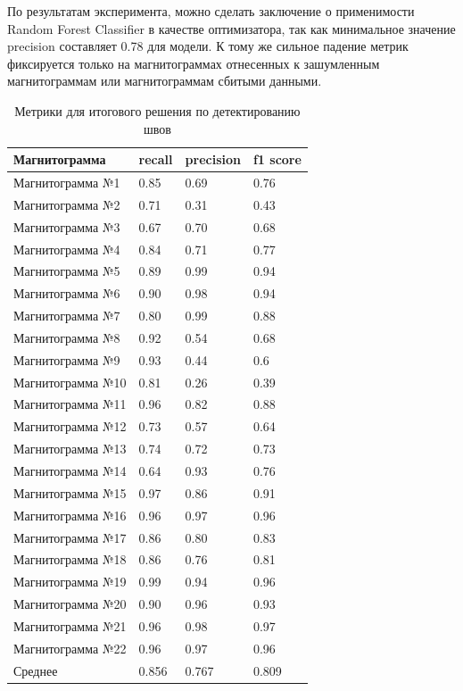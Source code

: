 \documentclass[a4paper,article,14pt]{extarticle}
\begin{document}
По результатам эксперимента, можно сделать заключение о применимости Random Forest Classifier в качестве 
оптимизатора, так как минимальное значение precision составляет 0.78 для модели. К тому же сильное 
падение метрик фиксируется только на магнитограммах отнесенных к зашумленным магнитограммам или 
магнитограммам сбитыми данными.

\begin{center}
    \begin{longtable}{|p{5cm}|p{3cm}|p{3cm}|p{3cm}|}
        \caption{Метрики для итогового решения по детектированию швов}\\\hline
        Магнитограмма & recall & precision & f1 score \\ \hline
        Магнитограмма №1 & 0.85 & 0.69 & 0.76 \\ \hline
        Магнитограмма №2 & 0.71 & 0.31 & 0.43 \\ \hline
        Магнитограмма №3 & 0.67 & 0.70 & 0.68 \\ \hline
        Магнитограмма №4 & 0.84 & 0.71 & 0.77 \\ \hline
        Магнитограмма №5 & 0.89 & 0.99 & 0.94 \\ \hline
        Магнитограмма №6 & 0.90 & 0.98 & 0.94 \\ \hline
        Магнитограмма №7 & 0.80 & 0.99 & 0.88 \\ \hline
        Магнитограмма №8 & 0.92 & 0.54 & 0.68 \\ \hline
        Магнитограмма №9 & 0.93 & 0.44 & 0.6 \\ \hline
        Магнитограмма №10 & 0.81 & 0.26 & 0.39 \\ \hline
        Магнитограмма №11 & 0.96 & 0.82 & 0.88 \\ \hline
        Магнитограмма №12 & 0.73 & 0.57 & 0.64 \\ \hline
        Магнитограмма №13 & 0.74 & 0.72 & 0.73 \\ \hline
        Магнитограмма №14 & 0.64 & 0.93 & 0.76 \\ \hline
        Магнитограмма №15 & 0.97 & 0.86 & 0.91 \\ \hline
        Магнитограмма №16 & 0.96 & 0.97 & 0.96 \\ \hline
        Магнитограмма №17 & 0.86 & 0.80 & 0.83 \\ \hline
        Магнитограмма №18 & 0.86 & 0.76 & 0.81 \\ \hline
        Магнитограмма №19 & 0.99 & 0.94 & 0.96 \\ \hline
        Магнитограмма №20 & 0.90 & 0.96 & 0.93 \\ \hline
        Магнитограмма №21 & 0.96 & 0.98 & 0.97 \\ \hline
        Магнитограмма №22 & 0.96 & 0.97 & 0.96 \\ \hline
        Среднее & 0.856 & 0.767 & 0.809 \\ \hline
    \end{longtable}
\end{center}
\end{document}
